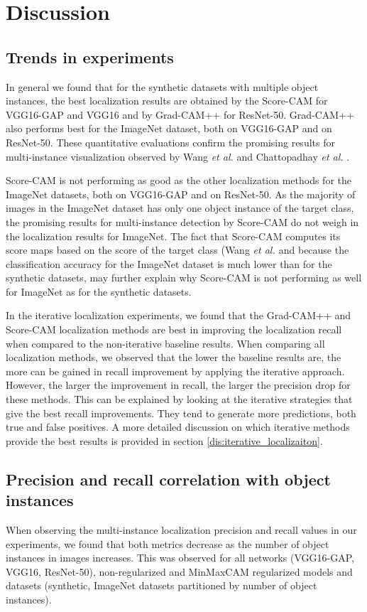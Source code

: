 \chapter{Discussion} \label{ch:discussion}

\section{Trends in experiments}
In general we found that for the synthetic datasets with multiple object instances, the best localization results are obtained by the Score-CAM for VGG16-GAP and VGG16 and by Grad-CAM++ for ResNet-50. Grad-CAM++ also performs best for the ImageNet dataset, both on VGG16-GAP and on ResNet-50. These quantitative evaluations confirm the promising results for multi-instance visualization observed by Wang \textit{et al.} \cite{wang2020score} and Chattopadhay \textit{et al.} \cite{chattopadhay2018grad}.

Score-CAM is not performing as good as the other localization methods for the ImageNet datasets, both on VGG16-GAP and on ResNet-50. As the majority of images in the ImageNet dataset has only one object instance of the target class, the promising results for multi-instance detection by Score-CAM do not weigh in the localization results for ImageNet. The fact that Score-CAM computes its score maps based on the score of the target class (Wang \textit{et al. \cite{wang2020score}} and because the classification accuracy for the ImageNet dataset is much lower than for the synthetic datasets, may further explain why Score-CAM is not performing as well for ImageNet as for the synthetic datasets.


In the iterative localization experiments, we found that the Grad-CAM++ and Score-CAM localization methods are best in improving the localization recall when compared to the non-iterative baseline results. When comparing all localization methods, we observed that the lower the baseline results are, the more can be gained in recall improvement by applying the iterative approach. However, the larger the improvement in recall, the larger the precision drop for these methods. This can be explained by looking at the iterative strategies that give the best recall improvements. They tend to generate more predictions, both true and false positives. A more detailed discussion on which iterative methods provide the best results is provided in section \ref{dis:iterative_localizaiton}.

\section{Precision and recall correlation with object instances}
When observing the multi-instance localization precision and recall values in our experiments, we found that both metrics decrease as the number of object instances in images increases. This was observed for all networks (VGG16-GAP, VGG16, ResNet-50), non-regularized and MinMaxCAM regularized models and datasets (synthetic, ImageNet datasets partitioned by number of object instances).

